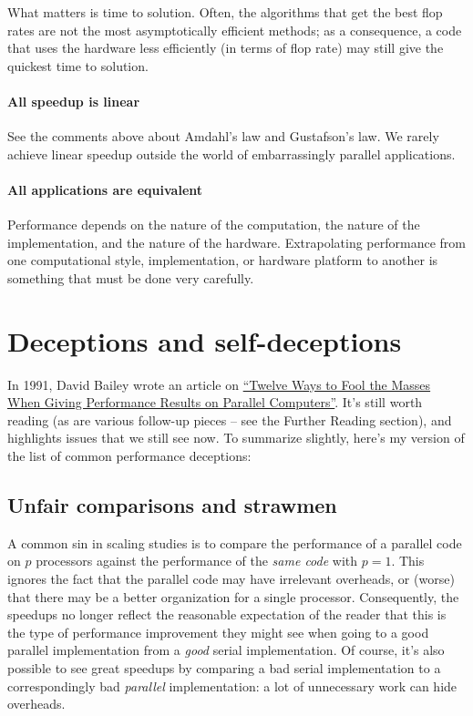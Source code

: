 \documentclass[12pt, leqno]{article} %
\begin{document}
What matters is time to solution. Often, the algorithms that get the
best flop rates are not the most asymptotically efficient methods; as a
consequence, a code that uses the hardware less efficiently (in terms of
flop rate) may still give the quickest time to solution.

\paragraph{All speedup is linear}

See the comments above about Amdahl's law and Gustafson's law. We rarely
achieve linear speedup outside the world of embarrassingly parallel
applications.

\paragraph{All applications are equivalent}

Performance depends on the nature of the computation, the nature of the
implementation, and the nature of the hardware. Extrapolating
performance from one computational style, implementation, or hardware
platform to another is something that must be done very carefully.

\section{Deceptions and self-deceptions}

In 1991, David Bailey wrote an article on
\href{http://www.davidhbailey.com/dhbpapers/twelve-ways.pdf}{``Twelve
Ways to Fool the Masses When Giving Performance Results on Parallel
Computers''}. It's still worth reading (as are various follow-up pieces
-- see the Further Reading section), and highlights issues that we still
see now. To summarize slightly, here's my version of the list of common
performance deceptions:

\subsection{Unfair comparisons and strawmen}

A common sin in scaling studies is to compare the performance of a
parallel code on $p$ processors against the performance of the
\emph{same code} with $p = 1$. This ignores the fact that the parallel
code may have irrelevant overheads, or (worse) that there may be a
better organization for a single processor. Consequently, the speedups
no longer reflect the reasonable expectation of the reader that this is
the type of performance improvement they might see when going to a good
parallel implementation from a \emph{good} serial implementation. Of
course, it's also possible to see great speedups by comparing a bad
serial implementation to a correspondingly bad \emph{parallel}
implementation: a lot of unnecessary work can hide overheads.
\end{document}
